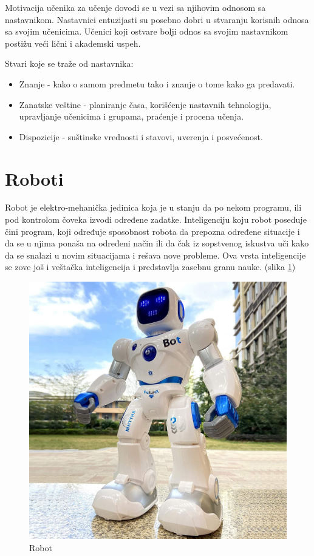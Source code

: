 \documentclass[a4paper]{article}
\begin{document}
Motivacija učenika za učenje dovodi se u vezi sa njihovim odnosom sa nastavnikom. Nastavnici entuzijasti su posebno dobri u stvaranju korisnih odnosa sa svojim učenicima. Učenici koji ostvare bolji odnos sa svojim nastavnikom postižu veći lični i akademski uspeh.

Stvari koje se traže od nastavnika:
\begin{itemize}
\item{} Znanje - kako o samom predmetu tako i znanje o tome kako ga predavati.
\item{} Zanatske veštine - planiranje časa, korišćenje nastavnih tehnologija, upravljanje učenicima i grupama, praćenje i procena učenja.
\item{} Dispozicije - suštinske vrednosti i stavovi, uverenja i posvećenost.
\end{itemize}


\newpage
\section{Roboti}
\label{sec:naslov3}

Robot je elektro-mehanička jedinica koja je u stanju da po nekom programu, ili pod kontrolom čoveka izvodi određene zadatke. Inteligenciju koju robot poseduje čini program, koji određuje sposobnost robota da prepozna određene situacije i da se u njima ponaša na određeni način ili da čak iz sopstvenog iskustva uči kako da se snalazi u novim situacijama i rešava nove probleme. Ova vrsta inteligencije se zove još i veštačka inteligencija i predstavlja zasebnu granu nauke. (slika \ref{fig:robot})

\begin{figure}[ht!]
\begin{center}
\includegraphics[scale=0.15]{robot1.jpg}
\end{center}
\caption{Robot}
\label{fig:robot}
\end{figure}
\end{document}
